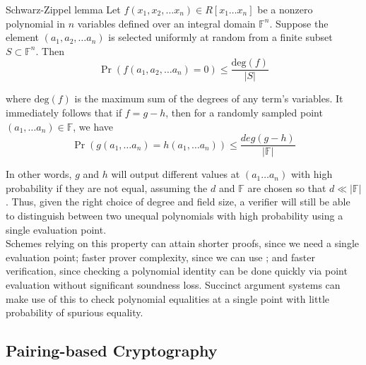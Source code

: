 \begin{lemma}{Schwarz-Zippel lemma}
\noindent Let $f(x_1, x_2, \dots x_n) \in R[x_1 \dots x_n]$ be a nonzero polynomial in $n$ variables defined over an integral domain $\mathbb{F}^{n}$. Suppose the element $(a_1, a_2, \dots a_n)$ is selected uniformly at random from a finite subset $S \subset \mathbb{F}^n$. Then 
$$
    \Pr(f(a_1, a_2, \dots a_n) = 0) \le \frac{\text{deg}(f)}{|S|}
$$
\end{lemma}

\noindent where $\text{deg}(f)$ is the maximum sum of the degrees of any term's variables. It immediately follows that if $f = g-h$, then for a randomly sampled point $(a_1, \dots a_n) \in \mathbb{F}$, we have
$$
\Pr(g(a_1, \dots a_n) = h(a_1, \dots a_n)) \le \frac{deg(g-h)}{|\mathbb{F}|}$$

\noindent In other words, $g$ and $h$ will output different values at $(a_1 \dots a_n)$ with high probability if they are not equal, assuming the $d$ and $\mathbb{F}$ are chosen so that $d \ll |\mathbb{F}|$. Thus, given the right choice of degree and field size, a verifier will still be able to distinguish between two unequal polynomials with high probability using a single evaluation point.\\ 

\noindent Schemes relying on this property can attain shorter proofs, since we need a single evaluation point; faster prover complexity, since we can use ; and faster verification, since checking a polynomial identity can be done quickly via point evaluation without significant soundness loss. Succinct argument systems can make use of this to check polynomial equalities at a single point with little probability of spurious equality.

\subsection{Pairing-based Cryptography}

